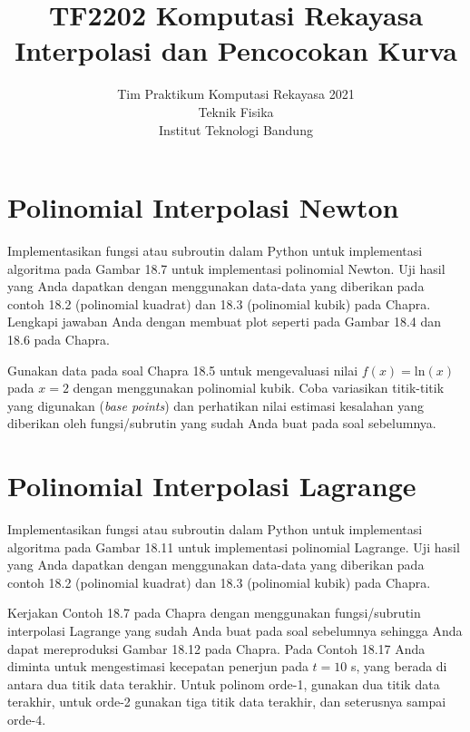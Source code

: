 



\title{%
{\small TF2202 Komputasi Rekayasa}\\
Interpolasi dan Pencocokan Kurva
}
\author{Tim Praktikum Komputasi Rekayasa 2021\\
Teknik Fisika\\
Institut Teknologi Bandung}
\date{}
\maketitle

\section{Polinomial Interpolasi Newton}

\begin{soal}
Implementasikan fungsi atau subroutin dalam Python untuk implementasi algoritma
pada Gambar 18.7 untuk implementasi polinomial Newton.
Uji hasil yang Anda dapatkan dengan menggunakan data-data yang diberikan pada contoh
18.2 (polinomial kuadrat) dan 18.3 (polinomial kubik) pada Chapra.
Lengkapi jawaban Anda dengan membuat plot seperti pada Gambar 18.4 dan 18.6 pada Chapra.
\end{soal}

\begin{soal}
Gunakan data pada soal Chapra 18.5 untuk mengevaluasi nilai $f(x) = \mathrm{ln}(x)$
pada $x = 2$ dengan menggunakan polinomial kubik. Coba variasikan titik-titik
yang digunakan (\textit{base points}) dan perhatikan nilai estimasi
kesalahan yang diberikan oleh
fungsi/subrutin yang sudah Anda buat pada soal sebelumnya.
\end{soal}

\section{Polinomial Interpolasi Lagrange}
\begin{soal}
Implementasikan fungsi atau subroutin dalam Python untuk implementasi algoritma
pada Gambar 18.11 untuk implementasi polinomial Lagrange.
Uji hasil yang Anda dapatkan dengan menggunakan data-data yang diberikan pada contoh
18.2 (polinomial kuadrat) dan 18.3 (polinomial kubik) pada Chapra.
\end{soal}

\begin{soal}
Kerjakan Contoh 18.7 pada Chapra dengan menggunakan fungsi/subrutin interpolasi Lagrange
yang sudah Anda buat pada soal sebelumnya sehingga Anda dapat mereproduksi Gambar 18.12
pada Chapra. Pada Contoh 18.17 Anda diminta untuk mengestimasi kecepatan penerjun
pada $t=10$ s, yang berada di antara dua titik data terakhir.
Untuk polinom orde-1, gunakan dua titik data terakhir, untuk orde-2 gunakan tiga titik
data terakhir, dan seterusnya sampai orde-4.
\end{soal}

